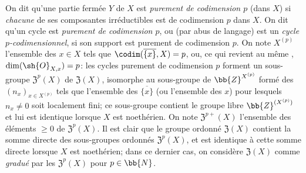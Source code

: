 \begin{env}[21.6.2]
On dit qu'une partie fermée $Y$ de $X$ est \emph{purement de codimension $p$} (dans $X$) si \emph{chacune} de ses composantes irréductibles est de codimension $p$ dans $X$.
On dit qu'un cycle est \emph{purement de codimension $p$}, ou (par abus de langage) est un \emph{cycle $p$-codimensionnel}, si son support est purement de codimension $p$.
On note $X^{(p)}$ l'ensemble des $x\in X$ tels que $\codim(\overline{\{x\}},X)=p$, ou, ce qui revient au même , $\dim(\sh{O}_{X,x})=p$:
les cycles purement de codimension $p$ forment un sous-groupe $\mathfrak{Z}^p(X)$ de $\mathfrak{Z}(X)$, isomorphe au sous-groupe de $\bb{Z}^{X^{(p)}}$ formé des $(n_x)_{x\in X^{(p)}}$ tels que l'ensemble des $\overline{\{x\}}$ (ou l'ensemble des $x$) pour lesquels $n_x\neq0$ soit localement fini;
ce sous-groupe contient le groupe libre $\bb{Z}^{(X^{(p)})}$ et lui est identique lorsque $X$ est noethérien.
On note $\mathfrak{Z}^{p+}(X)$ l'ensemble des éléments $\geq0$ de $\mathfrak{Z}^p(X)$.
Il est clair que le groupe ordonné $\mathfrak{Z}(X)$ contient la somme directe des sous-groupes ordonnés $\mathfrak{Z}^p(X)$, et est identique à cette somme directe lorsque $X$ est noethérien;
dans ce dernier cas, on considère $\mathfrak{Z}(X)$ comme \emph{gradué} par les $\mathfrak{Z}^p(X)$ pour $p\in\bb{N}$.
\end{env}

